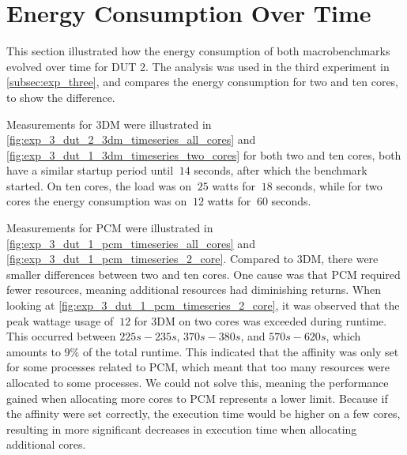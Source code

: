 \section{Energy Consumption Over Time}\label{app:timeseries}

This section illustrated how the energy consumption of both macrobenchmarks evolved over time for DUT 2. The analysis was used in the third experiment in \cref{subsec:exp_three}, and compares the energy consumption for two and ten cores, to show the difference.



Measurements for 3DM were illustrated in \cref{fig:exp_3_dut_2_3dm_timeseries_all_cores} and \cref{fig:exp_3_dut_1_3dm_timeseries_two_cores} for both two and ten cores, both have a similar startup period until $~14$ seconds, after which the benchmark started. On ten cores,  the load was on $~25$ watts for $~18$ seconds, while for two cores the energy consumption was on $~12$ watts for $~60$ seconds. 






Measurements for PCM were illustrated in \cref{fig:exp_3_dut_1_pcm_timeseries_all_cores} and \cref{fig:exp_3_dut_1_pcm_timeseries_2_core}. Compared to 3DM, there were smaller differences between two and ten cores. One cause was that PCM required fewer resources, meaning additional resources had diminishing returns. When looking at \cref{fig:exp_3_dut_1_pcm_timeseries_2_core}, it was observed that the peak wattage usage of $~12$ for 3DM on two cores was exceeded during runtime. This occurred between $225s-235s$, $370s-380s$, and $570s-620s$, which amounts to $9\%$ of the total runtime. This indicated that the affinity was only set for some processes related to PCM, which meant that too many resources were allocated to some processes. We could not solve this, meaning the performance gained when allocating more cores to PCM represents a lower limit. Because if the affinity were set correctly, the execution time would be higher on a few cores, resulting in more significant decreases in execution time when allocating additional cores.

